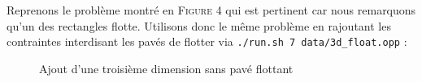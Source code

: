 \documentclass[a4paper]{article}
\begin{document}
Reprenons le problème montré en \textsc{Figure 4} qui est pertinent car nous remarquons qu'un des rectangles flotte. Utilisons donc le même problème en rajoutant les contraintes interdisant les pavés de flotter via \texttt{./run.sh 7 data/3d\_float.opp} : 
\begin{figure}[H]
  \centering
  \caption{Ajout d'une troisième dimension sans pavé flottant}
\end{figure}
\end{document}
